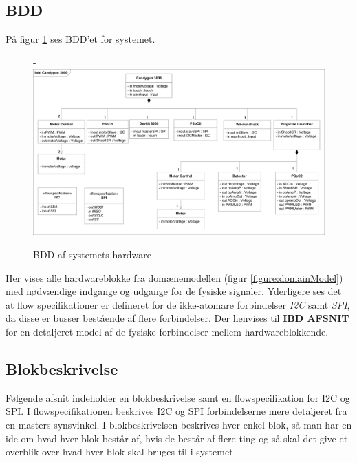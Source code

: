 \subsection{BDD}
\label{afsnit:BDD}
På figur \ref{figure:bddDiagram} ses BDD'et for systemet.

\begin{figure}[H]
	\begin{adjustwidth}{-3cm}{-\rightmargin}
	\centering
	\includegraphics[width=0.85\paperwidth]{SystemArkitektur/images/BDD_overordnet1}
	\caption{BDD af systemets hardware}
	\label{figure:bddDiagram}
	\end{adjustwidth}
\end{figure}

\noindent Her vises alle hardwareblokke fra domænemodellen (figur \ref{figure:domainModel}) med nødvændige indgange og udgange for de fysiske signaler. Yderligere ses det at flow specifikationer er defineret for de ikke-atomare forbindelser \textit{I2C} samt \textit{SPI}, da disse er busser bestående af flere forbindelser. Der henvises til \textbf{IBD AFSNIT} for en detaljeret model af de fysiske forbindelser mellem hardwareblokkende.

\subsection{Blokbeskrivelse}
Følgende afsnit indeholder en blokbeskrivelse samt en flowspecifikation for I2C og SPI. I flowspecifikationen beskrives I2C og SPI forbindelserne mere detaljeret fra en masters synsvinkel.  I blokbeskrivelsen beskrives hver enkel blok, så man har en ide om hvad hver blok består af, hvis de består af flere ting og så skal det give et overblik over hvad hver blok skal bruges til i systemet \newline \newline

